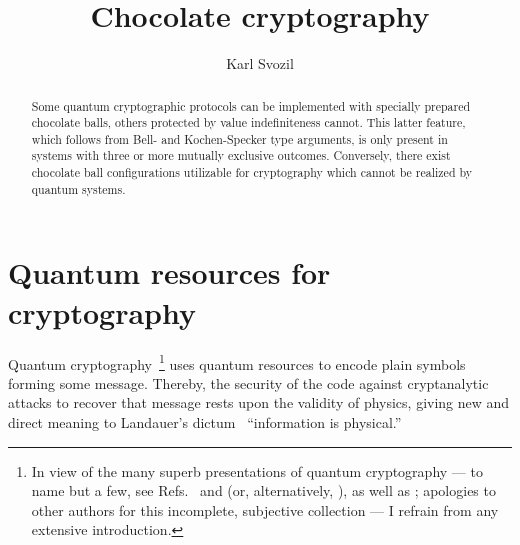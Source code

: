 \documentclass[%
 preprint,
 showpacs,
 showkeys,
 preprintnumbers,
 amsmath,amssymb,
 aps,
 pra,
  longbibliography,
 ]{revtex4-1}
\begin{document}



\title{Chocolate cryptography}

\author{Karl Svozil}

\begin{abstract}
Some quantum cryptographic protocols can be implemented with specially prepared chocolate balls, others protected by value indefiniteness cannot. This latter feature, which follows from Bell- and Kochen-Specker type arguments, is only present in systems with three or more mutually exclusive outcomes. Conversely, there exist chocolate ball configurations utilizable for cryptography which cannot be realized by quantum systems.
\end{abstract}





\maketitle

\section{Quantum resources for cryptography}

Quantum cryptography~\footnote{
In view of the many superb presentations of quantum cryptography
--- to name but a few, see Refs.~\cite{gisin-qc-rmp,arXiv:0802.4155}  and
\cite[Chapter~6]{mermin-04} (or, alternatively, \cite[Section 6.2]{mermin-07}),
as well as
\cite[Section~12.6]{nielsen-book};
apologies to other authors for this incomplete, subjective collection
---
I refrain from any extensive introduction.
}
uses quantum resources to encode plain symbols forming some message.
Thereby, the security of the code against cryptanalytic attacks to recover
that message rests upon the validity of physics, giving new and direct meaning to
Landauer's dictum~\cite{landauer} ``information is physical.''
\end{document}
